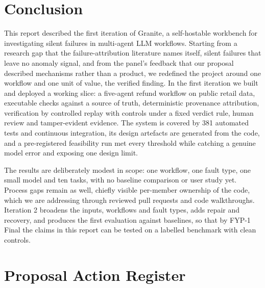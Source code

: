 \documentclass{fast-nuces-bs}
\begin{document}
\chapter{Conclusion}

This report described the first iteration of Granite, a self-hostable workbench for investigating silent failures in multi-agent LLM workflows. Starting from a research gap that the failure-attribution literature names itself, silent failures that leave no anomaly signal, and from the panel's feedback that our proposal described mechanisms rather than a product, we redefined the project around one workflow and one unit of value, the verified finding. In the first iteration we built and deployed a working slice: a five-agent refund workflow on public retail data, executable checks against a source of truth, deterministic provenance attribution, verification by controlled replay with controls under a fixed verdict rule, human review and tamper-evident evidence. The system is covered by 381 automated tests and continuous integration, its design artefacts are generated from the code, and a pre-registered feasibility run met every threshold while catching a genuine model error and exposing one design limit.

The results are deliberately modest in scope: one workflow, one fault type, one small model and ten tasks, with no baseline comparison or user study yet. Process gaps remain as well, chiefly visible per-member ownership of the code, which we are addressing through reviewed pull requests and code walkthroughs. Iteration 2 broadens the inputs, workflows and fault types, adds repair and recovery, and produces the first evaluation against baselines, so that by FYP-1 Final the claims in this report can be tested on a labelled benchmark with clean controls.


\appendix
\chapter{Proposal Action Register}
\end{document}
